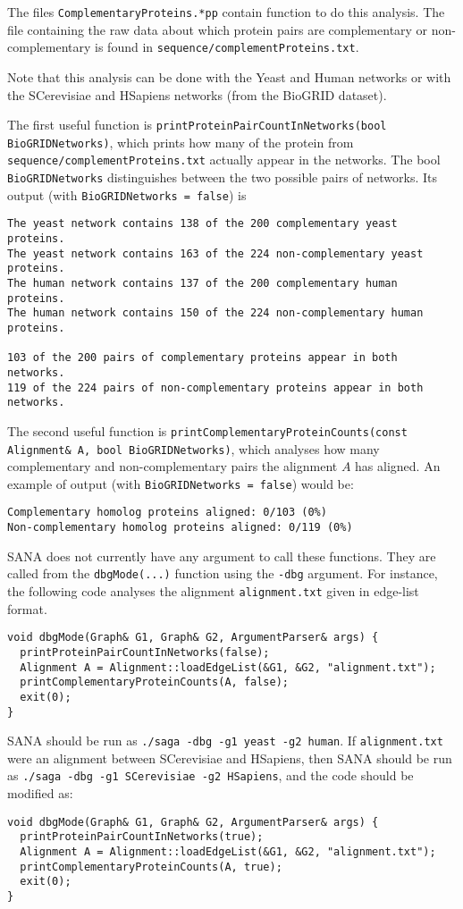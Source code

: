 \documentclass[]{article}
\begin{document}
The files \texttt{ComplementaryProteins.*pp} contain function to do this analysis. The file containing the raw data about which protein pairs are complementary or non-complementary is found in \texttt{sequence/complementProteins.txt}.

Note that this analysis can be done with the Yeast and Human networks or with the SCerevisiae and HSapiens networks (from the BioGRID dataset).

The first useful function is \texttt{printProteinPairCountInNetworks(bool BioGRIDNetworks)}, which prints how many of the protein from \texttt{sequence/complementProteins.txt} actually appear in the networks. The bool \texttt{BioGRIDNetworks} distinguishes between the two possible pairs of networks. Its output (with \texttt{BioGRIDNetworks = false}) is
\begin{verbatim}
The yeast network contains 138 of the 200 complementary yeast proteins.
The yeast network contains 163 of the 224 non-complementary yeast proteins.
The human network contains 137 of the 200 complementary human proteins.
The human network contains 150 of the 224 non-complementary human proteins.

103 of the 200 pairs of complementary proteins appear in both networks.
119 of the 224 pairs of non-complementary proteins appear in both networks.
\end{verbatim}
The second useful function is \texttt{printComplementaryProteinCounts(const Alignment\& A, bool BioGRIDNetworks)}, which analyses how many complementary and non-complementary pairs the alignment $A$ has aligned. An example of output (with \texttt{BioGRIDNetworks = false}) would be:
\begin{verbatim}
Complementary homolog proteins aligned: 0/103 (0%)
Non-complementary homolog proteins aligned: 0/119 (0%)
\end{verbatim}

SANA does not currently have any argument to call these functions. They are called from the \texttt{dbgMode(...)} function using the \texttt{-dbg} argument. For instance, the following code analyses the alignment \texttt{alignment.txt} given in edge-list format.
\begin{verbatim}
void dbgMode(Graph& G1, Graph& G2, ArgumentParser& args) {
  printProteinPairCountInNetworks(false);
  Alignment A = Alignment::loadEdgeList(&G1, &G2, "alignment.txt");
  printComplementaryProteinCounts(A, false);
  exit(0);
}
\end{verbatim}
SANA should be run as \texttt{./saga -dbg -g1 yeast -g2 human}. If \texttt{alignment.txt} were an alignment between SCerevisiae and HSapiens, then SANA should be run as \texttt{./saga -dbg -g1 SCerevisiae -g2 HSapiens}, and the code should be modified as:
\begin{verbatim}
void dbgMode(Graph& G1, Graph& G2, ArgumentParser& args) {
  printProteinPairCountInNetworks(true);
  Alignment A = Alignment::loadEdgeList(&G1, &G2, "alignment.txt");
  printComplementaryProteinCounts(A, true);
  exit(0);
}
\end{verbatim}
\end{document}
